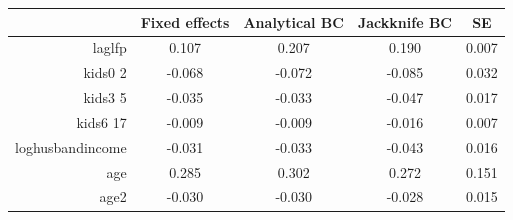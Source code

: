 \begin{tabular}{rcccc}\hline  
 & Fixed effects  & Analytical  BC & Jackknife BC & SE  \\ \hline  
laglfp &     0.107 &     0.207 &     0.190 &     0.007 \\  
kids0 2 &    -0.068 &    -0.072 &    -0.085 &     0.032 \\  
kids3 5 &    -0.035 &    -0.033 &    -0.047 &     0.017 \\  
kids6 17 &    -0.009 &    -0.009 &    -0.016 &     0.007 \\  
loghusbandincome &    -0.031 &    -0.033 &    -0.043 &     0.016 \\  
age &     0.285 &     0.302 &     0.272 &     0.151 \\  
age2 &    -0.030 &    -0.030 &    -0.028 &     0.015 \\ \hline 
  \end{tabular}
